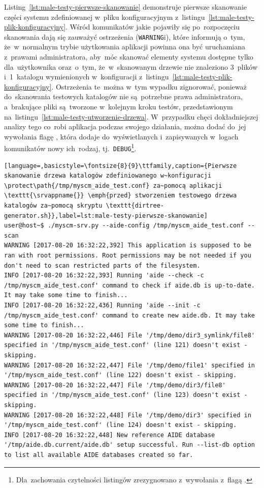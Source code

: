\documentclass[thesis]{subfiles}
\begin{document}
Listing~\ref{lst:male-testy-pierwsze-skanowanie} demonstruje pierwsze skanowanie części systemu zdefiniowanej w~pliku konfiguracyjnym  z~listingu~\ref{lst:male-testy-plik-konfiguracyjny}. Wśród komunikatów jakie pojawiły się po~rozpoczęciu skanowania dają się zauważyć ostrzeżenia (\texttt{WARNING}i), które informują o~tym, że~w~normalnym trybie użytkowania aplikacji powinna ona być uruchamiana z~prawami administratora, aby~móc skanować elementy systemu dostępne tylko dla~użytkownika \superuser{} oraz~o~tym, że~w~skanowanym drzewie nie znaleziono 3~plików i~1~katalogu wymienionych w~konfiguracji  z~listingu~\ref{lst:male-testy-plik-konfiguracyjny}. Ostrzeżenia te~można w~tym wypadku zignorować, ponieważ do~skanowania testowych katalogów nie są~potrzebne prawa administratora, a~brakujące pliki są~tworzone w~kolejnym kroku testów, przedstawionym na~listingu~\ref{lst:male-testy-utworzenie-drzewa}. W~przypadku chęci dokładniejszej analizy tego co~robi aplikacja \texttt{\srvappname{}} podczas swojego działania, można dodać do~jej wywołania flagę , która dodaje do~wyświetlanych i~zapisywanych w~logach komunikatów nowy ich~rodzaj, tj.~\texttt{DEBUG}\footnote{Dla~zachowania czytelności listingów zrezygnowano z~wywołania \texttt{\srvappname{}} z~flagą .}.

\begin{lstlisting}[language=,basicstyle=\fontsize{8}{9}\ttfamily,caption={Pierwsze skanowanie drzewa katalogów zdefiniowanego w~konfiguracji \protect\path{/tmp/myscm_aide_test.conf} za~pomocą aplikacji \texttt{\srvappname{}} \emph{przed} stworzeniem testowego drzewa katalogów za~pomocą skryptu \texttt{dirtree-generator.sh}},label=lst:male-testy-pierwsze-skanowanie]
user@host~$ ./myscm-srv.py --aide-config /tmp/myscm_aide_test.conf --scan
WARNING [2017-08-20 16:32:22,392] This application is supposed to be ran with root permissions. Root permissions may be not needed if you don't need to scan restricted parts of the filesystem.
INFO [2017-08-20 16:32:22,393] Running 'aide --check -c /tmp/myscm_aide_test.conf' command to check if aide.db is up-to-date. It may take some time to finish...
INFO [2017-08-20 16:32:22,436] Running 'aide --init -c /tmp/myscm_aide_test.conf' command to create new aide.db. It may take some time to finish...
WARNING [2017-08-20 16:32:22,446] File '/tmp/demo/dir3_symlink/file8' specified in '/tmp/myscm_aide_test.conf' (line 121) doesn't exist - skipping.
WARNING [2017-08-20 16:32:22,447] File '/tmp/demo/file1' specified in '/tmp/myscm_aide_test.conf' (line 122) doesn't exist - skipping.
WARNING [2017-08-20 16:32:22,447] File '/tmp/demo/dir3/file8' specified in '/tmp/myscm_aide_test.conf' (line 123) doesn't exist - skipping.
WARNING [2017-08-20 16:32:22,448] File '/tmp/demo/dir3' specified in '/tmp/myscm_aide_test.conf' (line 124) doesn't exist - skipping.
INFO [2017-08-20 16:32:22,448] New reference AIDE database '/tmp/aide.db.current/aide.db' setup successful. Run --list-db option to list all available AIDE databases created so far.
\end{lstlisting}
\end{document}
